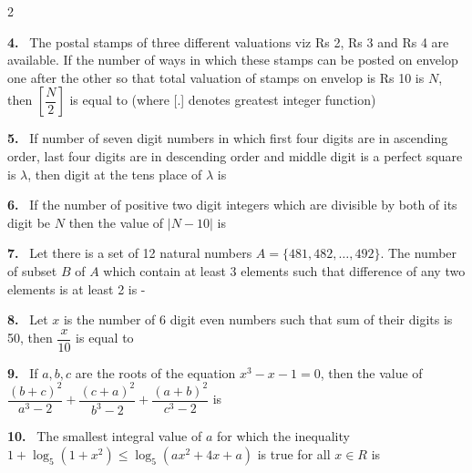 \documentclass[10pt]{extarticle}
\newcommand{\qn}[1]{\par\smallskip\noindent\textbf{#1.}~}
\begin{document}
\begin{multicols}{2}
\qn{4} The postal stamps of three different valuations viz Rs 2, Rs 3 and Rs 4 are available. If the number of ways in which these stamps can be posted on envelop one after the other so that total valuation of stamps on envelop is Rs 10 is $N$, then $\left[\dfrac N2\right]$ is equal to (where [.] denotes greatest integer function)
\qn{5} If number of seven digit numbers in which first four digits are in ascending order, last four digits are in descending order and middle digit is a perfect square is $\lambda$, then digit at the tens place of $\lambda$ is
\qn{6} If the number of positive two digit integers which are divisible by both of its digit be $N$ then the value of $|N-10|$ is
\qn{7} Let there is a set of 12 natural numbers $A=\{481,482,\dots,492\}$. The number of subset $B$ of $A$ which contain at least 3 elements such that difference of any two elements is at least 2 is -
\qn{8} Let $x$ is the number of 6 digit even numbers such that sum of their digits is 50, then $\dfrac{x}{10}$ is equal to
\qn{9} If $a,b,c$ are the roots of the equation $x^3-x-1=0$, then the value of $\dfrac{(b+c)^2}{a^3-2}+\dfrac{(c+a)^2}{b^3-2}+\dfrac{(a+b)^2}{c^3-2}$ is
\qn{10} The smallest integral value of $a$ for which the inequality $1+\log_5(1+x^2)\le\log_5(ax^2+4x+a)$ is true for all $x\in R$ is
\end{multicols}
\end{document}
